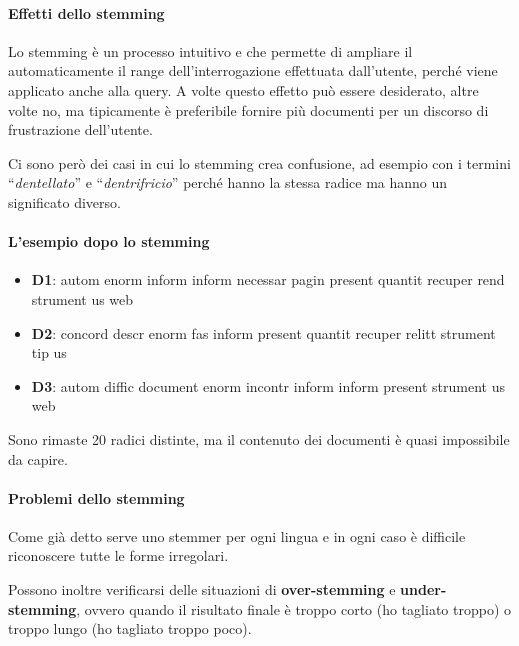 \paragraph{Effetti dello stemming}

Lo stemming è un processo intuitivo e che permette di ampliare il automaticamente il range dell'interrogazione effettuata dall'utente, perché viene applicato anche alla query. A volte questo effetto può essere desiderato, altre volte no, ma tipicamente è preferibile fornire più documenti per un discorso di frustrazione dell'utente.

Ci sono però dei casi in cui lo stemming crea confusione, ad esempio con i termini ``\textit{dentellato}'' e ``\textit{dentrifricio}'' perché hanno la stessa radice ma hanno un significato diverso.

\paragraph{L'esempio dopo lo stemming}

\begin{itemize}
	\item \textbf{D1}: autom enorm inform inform necessar pagin present quantit recuper rend strument us web
	\item \textbf{D2}: concord descr enorm fas inform present quantit recuper relitt strument tip us
	\item \textbf{D3}: autom diffic document enorm incontr 	inform inform present strument us web
\end{itemize}

Sono rimaste 20 radici distinte, ma il contenuto dei documenti è quasi impossibile da capire.

\paragraph{Problemi dello stemming}

Come già detto serve uno stemmer per ogni lingua e in ogni caso è difficile riconoscere tutte le forme irregolari.

Possono inoltre verificarsi delle situazioni di \textbf{over-stemming} e \textbf{under-stemming}, ovvero quando il risultato finale è troppo corto (ho tagliato troppo) o troppo lungo (ho tagliato troppo poco).













